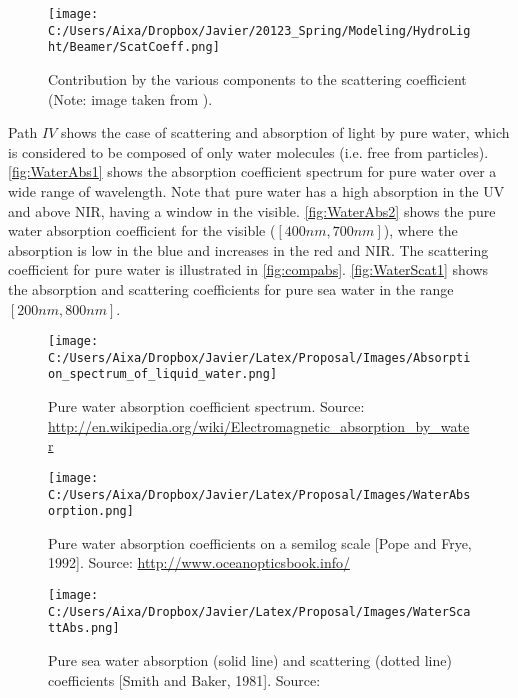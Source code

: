 \begin{figure}[htb]
\centering
      \texttt{[image: C:/Users/Aixa/Dropbox/Javier/20123\_Spring/Modeling/HydroLight/Beamer/ScatCoeff.png]}
      \caption{Contribution by the various components to the scattering coefficient (Note: image taken from \cite{Mobley:2001}).}
      \label{fig:compscat}
\end{figure}

Path $IV$ shows the case of scattering and absorption of light by pure water, which is considered to be composed of only water molecules (i.e. free from particles). \autoref{fig:WaterAbs1} shows the absorption coefficient spectrum for pure water over a wide range of wavelength. Note that pure water has a high absorption in the UV and above NIR, having a window in the visible. \autoref{fig:WaterAbs2} shows the pure water absorption coefficient for the visible ($[400nm,700nm]$), where the absorption is low in the blue and increases in the red and NIR. The scattering coefficient for pure water is illustrated in \autoref{fig:compabs}. \autoref{fig:WaterScat1} shows the absorption and scattering coefficients for pure sea water in the range $[200nm,800nm]$.

\begin{figure}[!ht]
  \centering
      \texttt{[image: C:/Users/Aixa/Dropbox/Javier/Latex/Proposal/Images/Absorption\_spectrum\_of\_liquid\_water.png]}
  \caption{Pure water absorption coefficient spectrum. Source: \protect\url{http://en.wikipedia.org/wiki/Electromagnetic_absorption_by_water}}
  \label{fig:WaterAbs1}
\end{figure}

\begin{figure}[!ht]
  \centering
      \texttt{[image: C:/Users/Aixa/Dropbox/Javier/Latex/Proposal/Images/WaterAbsorption.png]}
  \caption{Pure water absorption coefficients on a semilog scale [Pope and Frye, 1992].  Source: \protect\url{http://www.oceanopticsbook.info/}}
  \label{fig:WaterAbs2}
\end{figure}

\begin{figure}[!ht]
  \centering
      \texttt{[image: C:/Users/Aixa/Dropbox/Javier/Latex/Proposal/Images/WaterScattAbs.png]}
  \caption{Pure sea water absorption (solid line)  and scattering (dotted line) coefficients [Smith and Baker, 1981]. Source: \cite{Mobley1994}}
  \label{fig:WaterScat1}
\end{figure}


